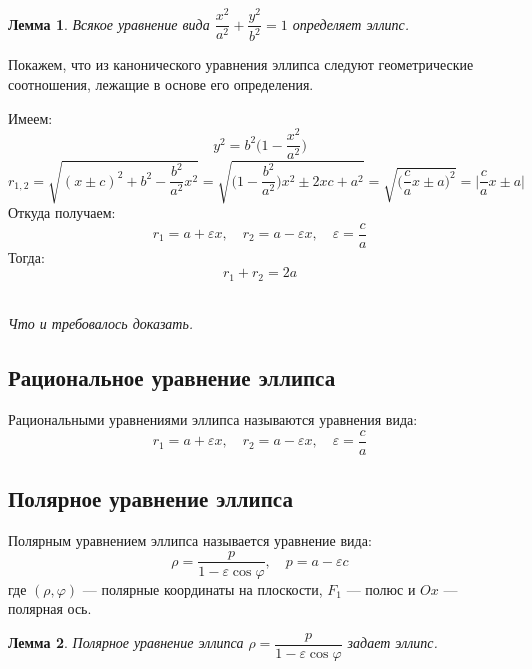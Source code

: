 \documentclass[a4paper,12pt,oneside]{extbook}
\newcommand{\newpar}{$ $\par\nobreak\ignorespaces}
\theoremstyle{numbered}
\theoremstyle{unnumbered}
\theoremstyle{named}
\theoremstyle{unnumbered}
\theoremstyle{named}
\newtheorem{lemma}{Лемма}[section]
\theoremstyle{named}
\theoremstyle{named}
\renewenvironment{proof}[1][]{\breakenv[Доказательство]{\if\relax\detokenize{#1}\relax\else\;\fi}{\textbf{#1}}}{\smallskip\newpar \hfill\textit{Что и требовалось доказать.}}
\begin{document}
\begin{lemma}
    Всякое уравнение вида \(\dfrac{x^2}{a^2} + \dfrac{y^2}{b^2} = 1\) определяет эллипс.
\end{lemma}

\begin{proof}
    Покажем, что из канонического уравнения эллипса следуют геометрические соотношения, лежащие в основе его определения.

    Имеем:
    \[
        y^2 = b^2 \Big(1 - \frac{x^2}{a^2}\Big)
    \]
    \[
        r_{1, 2} = \sqrt{(x \pm c)^2 + b^2 - \frac{b^2}{a^2} x^2} =
        \sqrt{\Big(1 - \frac{b^2}{a^2}\Big) x^2 \pm 2xc + a^2} =
        \sqrt{\Big(\frac{c}{a}x \pm a\Big)^2} = \Big| \frac{c}{a}x \pm a \Big|
    \]
    Откуда получаем:
    \[
        r_1 = a + \varepsilon x, \quad r_2 = a - \varepsilon x, \quad \varepsilon = \frac{c}{a}
    \]
    Тогда:
    \[
        r_1 + r_2 = 2a
    \]
\end{proof}

\subsection{Рациональное уравнение эллипса}%
\label{sub:Рациональное уравнение эллипса}

\begin{siderules}
    Рациональными уравнениями эллипса называются уравнения вида:
    \[
        r_1  = a + \varepsilon x, \quad r_2 = a - \varepsilon x, \quad \varepsilon = \frac{c}{a}
    \]
\end{siderules}

\subsection{Полярное уравнение эллипса}%
\label{sub:Полярное уравнение эллипса}

\begin{siderules}
    Полярным уравнением эллипса называется уравнение вида:
    \[
        \rho  = \frac{p}{1 - \varepsilon \cos{\varphi}}, \quad p = a - \varepsilon c
    \]
    где \((\rho, \varphi)\) — полярные координаты на плоскости, \(F_1\) — полюс и \(Ox\) — полярная ось.
\end{siderules}

\begin{lemma}
    Полярное уравнение эллипса \(\rho = \dfrac{p}{1 - \varepsilon \cos{\varphi}}\) задает эллипс.
\end{lemma}
\end{document}
